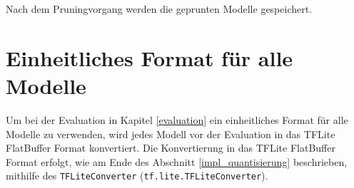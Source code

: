 Nach dem Pruningvorgang werden die geprunten Modelle gespeichert.



\section{Einheitliches Format für alle Modelle}
Um bei der Evaluation in Kapitel \ref{evaluation} ein einheitliches Format für alle Modelle zu verwenden, wird jedes Modell vor der Evaluation in das TFLite FlatBuffer Format konvertiert. Die Konvertierung in das TFLite FlatBuffer Format erfolgt, wie am Ende des Abschnitt \ref{impl_quantisierung} beschrieben, mithilfe des \lstinline{TFLiteConverter} (\lstinline{tf.lite.TFLiteConverter}).